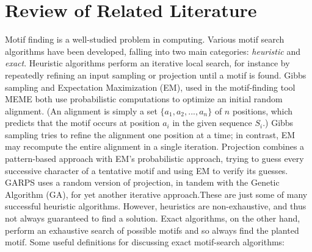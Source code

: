 \documentclass[conference]{IEEEtran}
\begin{document}
\section{Review of Related Literature}
	Motif finding is a well-studied problem in computing. Various motif search algorithms have been developed, falling into two main categories: \emph{heuristic} and \emph{exact}.
	Heuristic algorithms perform an iterative local search, for instance by repeatedly refining an input sampling or projection until a motif is found. Gibbs sampling \cite{lawrence1993detecting} and Expectation Maximization (EM), used in the motif-finding tool MEME \cite{lawrence1990expectation,bailey1995unsupervised} both use probabilistic computations to optimize an initial random alignment. (An alignment is simply a set $\{a_{1}, a_{2},...,a_{n}\}$ of $n$ positions, which predicts that the motif occurs at position $a_{i}$ in the given sequence $S_{i}$.) Gibbs sampling tries to refine the alignment one position at a time; in contrast, EM may recompute the entire alignment in a single iteration. Projection \cite{blanchette2002discovery} combines a pattern-based approach with EM's probabilistic approach,  trying to guess every successive character of a tentative motif and using EM to verify its guesses. GARPS \cite{huo2009combining} uses a random version of projection, in tandem with the Genetic Algorithm (GA), for yet another iterative approach.These are just some of many successful heuristic algorithms. However, heuristics are non-exhaustive, and thus not always guaranteed to find a solution. Exact algorithms, on the other hand, perform an exhaustive search of possible motifs and so always find the planted motif. Some useful definitions for discussing exact motif-search algorithms:
\end{document}
